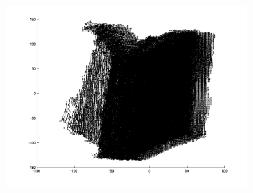 \begin{figure}[H]
\begin{subfigure}[b]{0.3\textwidth}
		\includegraphics[width=\textwidth]{Images/Book9.png}
		\caption{}
	\end{subfigure}	
	

\end{figure}
